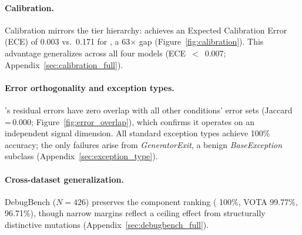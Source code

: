 \paragraph{Calibration.}
\label{sec:calibration}
Calibration mirrors the tier hierarchy:  achieves an Expected Calibration Error (ECE) of 0.003 vs.\ 0.171 for , a 63$\times$ gap (Figure~\ref{fig:calibration}).
This advantage generalizes across all four models (ECE~${<}$~0.007; Appendix~\ref{sec:calibration_full}).

\paragraph{Error orthogonality and exception types.}
's residual errors have zero overlap with all other conditions' error sets (Jaccard\,=\,0.000; Figure~\ref{fig:error_overlap}), which confirms it operates on an independent signal dimension.
All standard exception types achieve 100\% accuracy; the only failures arise from \textit{GeneratorExit}, a benign \textit{BaseException} subclass (Appendix~\ref{sec:exception_type}).

\paragraph{Cross-dataset generalization.}
\label{sec:debugbench}
DebugBench \citep{tian2024debugbench} ($N{=}426$) preserves the component ranking ( 100\%, VOTA 99.77\%,  96.71\%), though narrow margins reflect a ceiling effect from structurally distinctive mutations (Appendix~\ref{sec:debugbench_full}).

